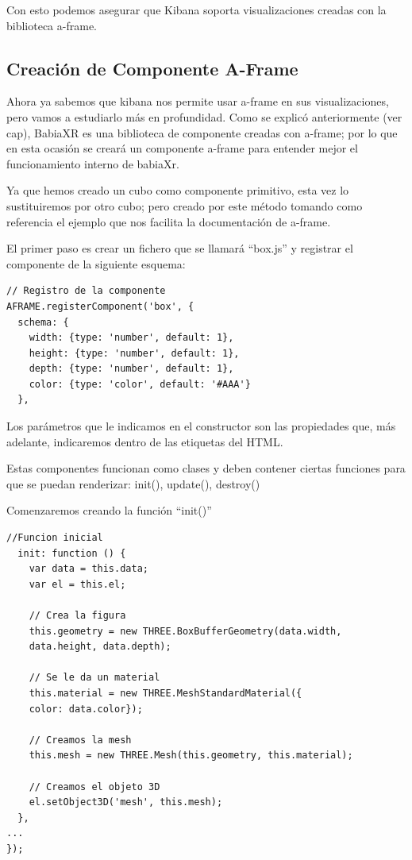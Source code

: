 \documentclass[a4paper, 12pt]{book}
\begin{document}
Con esto podemos asegurar que Kibana soporta visualizaciones creadas con la biblioteca a-frame.

\subsection{Creación de Componente A-Frame}

Ahora ya sabemos que kibana nos permite usar a-frame en sus visualizaciones, pero vamos a estudiarlo más en profundidad. Como se explicó anteriormente (ver cap), BabiaXR es una biblioteca de componente creadas con a-frame; por lo que en esta ocasión se creará un componente a-frame para entender mejor el funcionamiento interno de babiaXr.

Ya que hemos creado un cubo como componente primitivo, esta vez lo sustituiremos por otro cubo; pero creado por este método tomando como referencia el ejemplo que nos facilita la documentación de a-frame. 

El primer paso es crear un fichero que se llamará “box.js” y registrar el componente de la siguiente esquema:

\begin{lstlisting}[frame=single]
// Registro de la componente
AFRAME.registerComponent('box', {
  schema: {
    width: {type: 'number', default: 1},
    height: {type: 'number', default: 1},
    depth: {type: 'number', default: 1},
    color: {type: 'color', default: '#AAA'}
  },
\end{lstlisting}

Los parámetros que le indicamos en el constructor son las propiedades que, más adelante, indicaremos dentro de las etiquetas del HTML.

Estas componentes funcionan como clases y deben contener ciertas funciones para que se puedan renderizar: init(), update(), destroy()

Comenzaremos creando la función “init()”

\begin{lstlisting}[frame=single]
 //Funcion inicial
  init: function () {
    var data = this.data;
    var el = this.el;

    // Crea la figura
    this.geometry = new THREE.BoxBufferGeometry(data.width, 
    data.height, data.depth);

    // Se le da un material
    this.material = new THREE.MeshStandardMaterial({
    color: data.color});

    // Creamos la mesh
    this.mesh = new THREE.Mesh(this.geometry, this.material);

    // Creamos el objeto 3D
    el.setObject3D('mesh', this.mesh);
  },
...
});
\end{lstlisting}
\end{document}
